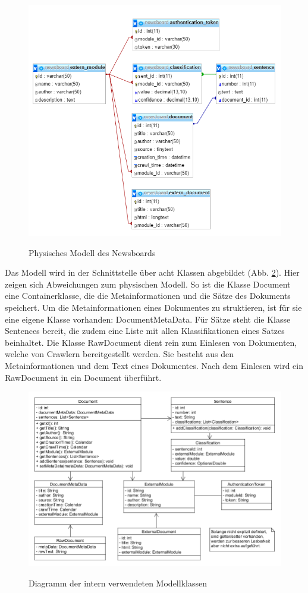 \begin{figure}[h]
	\centering
	\includegraphics[scale=0.8]{content/physical-model.png}
	\label{fig:physical_model}
	\caption{Physisches Modell des Newsboards}
\end{figure}

Das Modell wird in der Schnittstelle über acht Klassen abgebildet (Abb. 
\ref{fig:uml_model}). Hier zeigen sich Abweichungen zum physischen Modell. So ist die Klasse
Document eine Containerklasse, die die Metainformationen und die Sätze des Dokuments
speichert. Um die Metainformationen eines Dokumentes zu struktieren, ist für sie eine eigene
Klasse vorhanden: DocumentMetaData. Für Sätze steht die Klasse Sentences bereit, die zudem
eine Liste mit allen Klassifikationen eines Satzes beinhaltet. Die  Klasse RawDocument dient
rein zum Einlesen von Dokumenten, welche von Crawlern bereitgestellt werden. Sie besteht aus
den Metainformationen und dem Text eines Dokumentes. Nach dem Einlesen wird ein RawDocument
in ein Document überführt.

\begin{figure}[h]
	\centering
	\includegraphics[scale=0.5]{content/uml-model.png}
	\label{fig:uml_model}
	\caption{Diagramm der intern verwendeten Modellklassen}
\end{figure}

